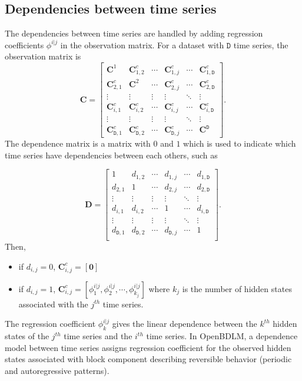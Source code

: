 \subsection{Dependencies between time series}
\label{S:Dependencies}
The dependencies between time series are handled by adding regression coefficients $\phi^{i|j}$ in the observation matrix.
For a dataset with $\mathtt{D}$ time series, the observation matrix is
\begin{equation*}
\mathbf{C}=\left[\begin{array}{cccccc}
\mathbf{C}^{1}& \mathbf{C}_{1,2}^{c}&\cdots & \mathbf{C}_{1,j}^{c}&\cdots& \mathbf{C}_{1,\mathtt{D}}^{c}\\
\mathbf{C}_{2,1}^{c}& \mathbf{C}^{2}&\cdots& \mathbf{C}_{2,j}^{c}&\cdots& \mathbf{C}_{2,\mathtt{D}}^{c}\\
\vdots&\vdots& \vdots& \vdots& \ddots& \vdots\\
\mathbf{C}_{i,1}^{c}& \mathbf{C}_{i,2}^{c}&\cdots&\mathbf{C}_{i,j}^{c}&\cdots&\mathbf{C}_{i,\mathtt{D}}^{c}\\
\vdots&\vdots& \vdots& \vdots& \ddots& \vdots\\
\mathbf{C}_{\mathtt{D},1}^{c}& \mathbf{C}_{\mathtt{D},2}^{c}&\cdots& \mathbf{C}_{\mathtt{D},j}^{c}&\cdots& \mathbf{C}^{\mathtt{D}}
\end{array}\right] \text{.}
\end{equation*}
The dependence matrix is a matrix with $0$ and $1$ which is used to indicate which time series have dependencies between each others, such as 

\begin{equation*}
\mathbf{D}=\left[\begin{array}{cccccc}
1&d_{1,2}&\cdots&d_{1,j}&\cdots&d_{1,\mathtt{D}}\\
d_{2,1}&1&\cdots&d_{2,j}&\cdots&d_{2,\mathtt{D}}\\
\vdots&\vdots&\vdots&\vdots&\ddots&\vdots\\
d_{i,1}&d_{i,2}&\cdots&1&\cdots&d_{i,\mathtt{D}}\\
\vdots&\vdots&\vdots&\vdots&\ddots&\vdots\\
d_{\mathtt{D},1}&d_{\mathtt{D},2}&\cdots&d_{\mathtt{D},j}&\cdots&1\\
\end{array}\right] \text{.}
\end{equation*}
Then, 
\begin{itemize}
\item if $d_{i,j}=0$, $\mathbf{C}_{i,j}^{c}=[\mathbf{0}]$
\item if $d_{i,j}=1$, $\mathbf{C}_{i,j}^{c}=\left[\phi^{i|j}_{1},\phi^{i|j}_{2},\cdots,\phi^{i|j}_{k_{j}}\right]$ where $k_{j}$ is the number of hidden states associated with the $j^{th}$ time series.
\end{itemize}
The regression coefficient $\phi^{i|j}_{k}$ gives the linear dependence between the $k^{th}$ hidden states of the $j^{th}$ time series and the $i^{th}$ time series.
In OpenBDLM, a dependence model between time series assigns regression coefficient for the observed hidden states associated with block component describing reversible behavior (periodic and autoregressive patterns).
